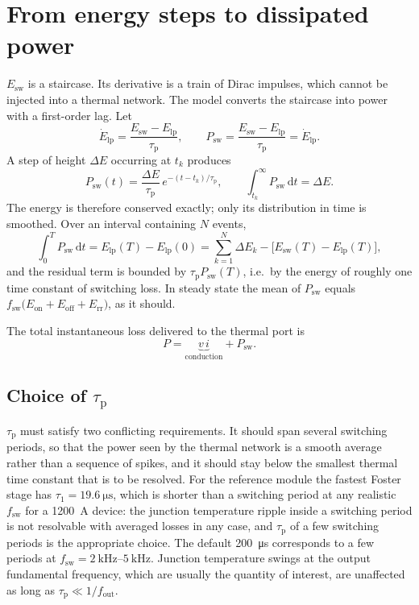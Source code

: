 \documentclass[11pt,a4paper]{article}
\begin{document}
\section{From energy steps to dissipated power}

$E_\mathrm{sw}$ is a staircase. Its derivative is a train of Dirac impulses,
which cannot be injected into a thermal network. The model converts the
staircase into power with a first-order lag. Let
\begin{equation}
  \dot{E}_\mathrm{lp} = \frac{E_\mathrm{sw} - E_\mathrm{lp}}{\tau_\mathrm{p}},
  \qquad
  P_\mathrm{sw} = \frac{E_\mathrm{sw} - E_\mathrm{lp}}{\tau_\mathrm{p}}
                = \dot{E}_\mathrm{lp}.
  \label{eq:lag}
\end{equation}
A step of height $\Delta E$ occurring at $t_k$ produces
\begin{equation}
  P_\mathrm{sw}(t) = \frac{\Delta E}{\tau_\mathrm{p}}\,
                     e^{-(t-t_k)/\tau_\mathrm{p}},
  \qquad
  \int_{t_k}^{\infty} P_\mathrm{sw}\,\mathrm{d}t = \Delta E .
\end{equation}
The energy is therefore conserved exactly; only its distribution in time is
smoothed. Over an interval containing $N$ events,
\begin{equation}
  \int_{0}^{T} P_\mathrm{sw}\,\mathrm{d}t
  = E_\mathrm{lp}(T) - E_\mathrm{lp}(0)
  = \sum_{k=1}^{N}\Delta E_k
    - \bigl[E_\mathrm{sw}(T) - E_\mathrm{lp}(T)\bigr],
\end{equation}
and the residual term is bounded by $\tau_\mathrm{p}P_\mathrm{sw}(T)$, i.e.\ by
the energy of roughly one time constant of switching loss. In steady state the
mean of $P_\mathrm{sw}$ equals $f_\mathrm{sw}\bigl(E_\mathrm{on} +
E_\mathrm{off} + E_\mathrm{rr}\bigr)$, as it should.

The total instantaneous loss delivered to the thermal port is
\begin{equation}
  P = \underbrace{v\,i}_{\text{conduction}} + P_\mathrm{sw}.
\end{equation}

\subsection{Choice of $\tau_\mathrm{p}$}

$\tau_\mathrm{p}$ must satisfy two conflicting requirements. It should span
several switching periods, so that the power seen by the thermal network is a
smooth average rather than a sequence of spikes, and it should stay below the
smallest thermal time constant that is to be resolved. For the reference module
the fastest Foster stage has $\tau_1 = \SI{19.6}{\micro\second}$, which is
shorter than a switching period at any realistic $f_\mathrm{sw}$ for a
\SI{1200}{\ampere} device: the junction temperature ripple inside a switching
period is not resolvable with averaged losses in any case, and
$\tau_\mathrm{p}$ of a few switching periods is the appropriate choice. The
default \SI{200}{\micro\second} corresponds to a few periods at
$f_\mathrm{sw} = \SIrange{2}{5}{\kilo\hertz}$. Junction temperature swings at
the output fundamental frequency, which are usually the quantity of interest,
are unaffected as long as $\tau_\mathrm{p} \ll 1/f_\mathrm{out}$.
\end{document}
